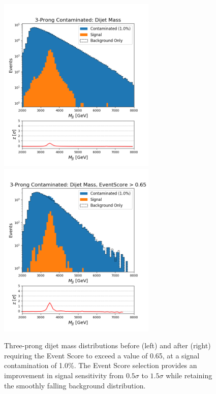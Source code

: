 \documentclass[11pt, a4paper]{article}
\begin{document}
\begin{figure}[H]
	\begin{center}
		\includegraphics[width=213pt]{imgs/bugfix/3Prong_Contaminated_1p0_JJ_Mass_Multi_SaveForPaper_Lead.png}
		\includegraphics[width=213pt]{imgs/bugfix/3Prong_Contaminated_1p0_JJ_Mass_EventScore0p65_Multi_SaveForPaper_Lead.png}
	\end{center}
	\caption{Three-prong dijet mass distributions before (left) and after (right) requiring the Event Score to exceed a value of 0.65, at a signal contamination of 1.0\%. The Event Score selection provides an improvement in signal sensitivity from $0.5\sigma$ to $1.5\sigma$ while retaining the smoothly falling background distribution.}
	\label{fig:3p_dijet}
\end{figure}



\end{document}
